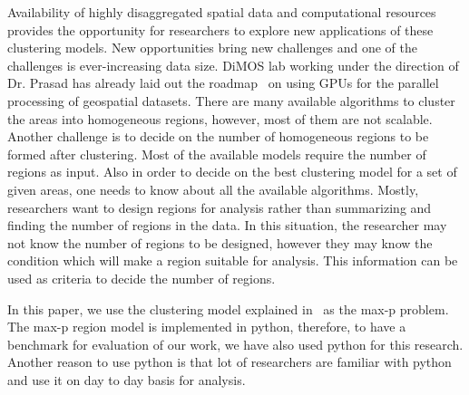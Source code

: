 \documentclass[conference]{IEEEtran}
\begin{document}
Availability of highly disaggregated spatial data and computational resources
provides the opportunity for researchers to explore new applications of these
clustering models. New opportunities bring new challenges and one of the
challenges is ever-increasing data size. DiMOS lab working under the direction of Dr. Prasad has already laid out the roadmap~\cite{r34,r35} on using GPUs for the parallel processing of geospatial datasets. There are many available algorithms to cluster the areas into homogeneous regions, however, most of them are not
scalable. Another challenge is to decide on the number of homogeneous regions to
be formed after clustering. Most of the available models require the number of
regions as input. Also in order to decide on the best clustering model for a set
of given areas, one needs to know about all the available algorithms. Mostly,
researchers want to design regions for analysis rather than summarizing and
finding the number of regions in the data. In this situation, the researcher may not
know the number of regions to be designed, however they may know the condition
which will make a region suitable for analysis. This information can be used as
criteria to decide the number of regions.

In this paper, we use the clustering model explained in~\cite{r1} as the max-p
problem. The max-p region model is implemented in python, therefore, to have a benchmark for evaluation of our work, we have also used python for this research. Another reason to use python is that lot of researchers are familiar with python and use it on day to day basis for analysis. 
\end{document}
